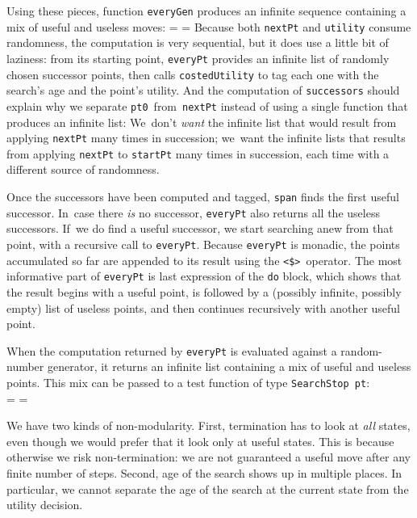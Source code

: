 \documentclass[nonatbib,preprint,blockstyle,times]{sigplanconf}
\newif\ifverbatimsmall
\newcommand\smallverbatiminput[1]{%
  \everypar=\expandafter{\the\everypar
       \verbatimsmallfalse
       \topsep=\standardvspace}%
  \topsep=0.78\topsep
  \verbatimsmalltrue}
\newcommand\smallverbatiminputx[1]{\vspace*{-8pt}{\small}} %
\newcommand\smallfuzzverbatiminput[2]{%
  \everypar\expandafter{\the\everypar\hfuzz=0pt\relax}%
  \hfuzz=#1 \smallverbatiminput{#2}}
\begin{document}
\noindent
\vbox{
Using these pieces, function \texttt{everyGen} produces an infinite
sequence containing a mix of useful and useless moves:
\smallfuzzverbatiminput{10.8pt}{everygen}
}
\noindent
Because both \texttt{nextPt} and \texttt{utility} consume randomness,
the computation is very sequential, but it does use a little bit of
laziness:
from its starting point, \texttt{everyPt} provides an infinite list of
randomly chosen successor points, then calls \texttt{costedUtility} to
tag each one with the search's age and the point's utility.
And the computation of \texttt{successors} should explain why we
separate \texttt{pt0}~from~\texttt{nextPt} instead of using a single
function that produces an infinite list:
We~don't \emph{want} the infinite list that would result from
applying \texttt{nextPt} many times in succession;
we~want the infinite lists that results from applying \texttt{nextPt}
to \texttt{startPt} many times in succession, each time with a
different source of randomness.

Once the successors have been computed and tagged,
\texttt{span} finds the first useful successor.
In~case there \emph{is} no successor, \texttt{everyPt} also returns
all the useless successors.
If~we do find a useful successor, we start searching anew from that
point, with a recursive call to \texttt{everyPt}.
Because \texttt{everyPt} is monadic, the points accumulated so far are
appended to its result using the \verb+<$>+~operator.
%
The most informative part of \texttt{everyPt} is last expression of
the \texttt{do} block,
which shows that the result begins with a useful point,
is followed by a (possibly infinite, possibly empty) list of useless
points, and then continues recursively with another useful point.

When the computation returned by \texttt{everyPt} is evaluated against
a random-number generator, it returns an infinite list containing a
mix of useful and useless points.
This mix can be passed to a test function of type \texttt{SearchStop~pt}:\\
\vbox{
\smallverbatiminput{strat}
\smallverbatiminputx{stop}
\smallverbatiminputx{search}
}
\noindent


We have two kinds of non-modularity.
First, termination has to
look at \emph{all} states, even though we would prefer that it look
only at useful states.
This is because otherwise we risk non-termination:
we are not guaranteed a useful move after any finite number of steps.
Second, age of the search shows up in multiple places.
In particular, we cannot separate the age of the search at the
current state from the utility decision.
\end{document}

